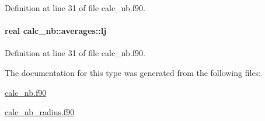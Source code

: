 Definition at line 31 of file calc\-\_\-nb.\-f90.

\hypertarget{structcalc__nb_1_1averages_ade656584c252dcd757623097f315b360}{
\paragraph[{lj}]{\setlength{\rightskip}{0pt plus 5cm}real calc\-\_\-nb\-::averages\-::lj}}\label{structcalc__nb_1_1averages_ade656584c252dcd757623097f315b360}


Definition at line 31 of file calc\-\_\-nb.\-f90.



The documentation for this type was generated from the following files\-:\begin{DoxyCompactItemize}
\item 
\hyperlink{calc__nb_8f90}{calc\-\_\-nb.\-f90}\item 
\hyperlink{calc__nb__radius_8f90}{calc\-\_\-nb\-\_\-radius.\-f90}\end{DoxyCompactItemize}
